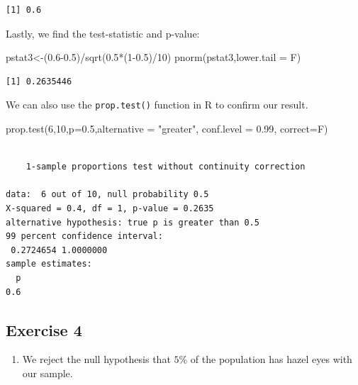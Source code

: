 \documentclass[
  letterpaper,
  DIV=11,
  numbers=noendperiod]{scrreprt}
\newenvironment{Shaded}{\begin{snugshade}}{\end{snugshade}}
\newcommand{\AttributeTok}[1]{\textcolor[rgb]{0.40,0.45,0.13}{#1}}
\newcommand{\DecValTok}[1]{\textcolor[rgb]{0.68,0.00,0.00}{#1}}
\newcommand{\FloatTok}[1]{\textcolor[rgb]{0.68,0.00,0.00}{#1}}
\newcommand{\FunctionTok}[1]{\textcolor[rgb]{0.28,0.35,0.67}{#1}}
\newcommand{\NormalTok}[1]{\textcolor[rgb]{0.00,0.23,0.31}{#1}}
\newcommand{\OtherTok}[1]{\textcolor[rgb]{0.00,0.23,0.31}{#1}}
\newcommand{\SpecialCharTok}[1]{\textcolor[rgb]{0.37,0.37,0.37}{#1}}
\newcommand{\StringTok}[1]{\textcolor[rgb]{0.13,0.47,0.30}{#1}}
\providecommand{\tightlist}{%
  \setlength{\itemsep}{0pt}\setlength{\parskip}{0pt}}\usepackage{longtable,booktabs,array}
\begin{document}
\begin{verbatim}
[1] 0.6
\end{verbatim}

Lastly, we find the test-statistic and p-value:

\begin{Shaded}
\begin{Highlighting}[numbers=left,,]
\NormalTok{pstat3}\OtherTok{\textless{}{-}}\NormalTok{(}\FloatTok{0.6{-}0.5}\NormalTok{)}\SpecialCharTok{/}\FunctionTok{sqrt}\NormalTok{(}\FloatTok{0.5}\SpecialCharTok{*}\NormalTok{(}\DecValTok{1}\FloatTok{{-}0.5}\NormalTok{)}\SpecialCharTok{/}\DecValTok{10}\NormalTok{)}
\FunctionTok{pnorm}\NormalTok{(pstat3,}\AttributeTok{lower.tail =}\NormalTok{ F)}
\end{Highlighting}
\end{Shaded}

\begin{verbatim}
[1] 0.2635446
\end{verbatim}

We can also use the \texttt{prop.test()} function in R to confirm our
result.

\begin{Shaded}
\begin{Highlighting}[numbers=left,,]
\FunctionTok{prop.test}\NormalTok{(}\DecValTok{6}\NormalTok{,}\DecValTok{10}\NormalTok{,}\AttributeTok{p=}\FloatTok{0.5}\NormalTok{,}\AttributeTok{alternative =} \StringTok{"greater"}\NormalTok{, }\AttributeTok{conf.level =} \FloatTok{0.99}\NormalTok{,}
            \AttributeTok{correct=}\NormalTok{F)}
\end{Highlighting}
\end{Shaded}

\begin{verbatim}

    1-sample proportions test without continuity correction

data:  6 out of 10, null probability 0.5
X-squared = 0.4, df = 1, p-value = 0.2635
alternative hypothesis: true p is greater than 0.5
99 percent confidence interval:
 0.2724654 1.0000000
sample estimates:
  p 
0.6 
\end{verbatim}

\hypertarget{exercise-4-13}{%
\subsection*{Exercise 4}\label{exercise-4-13}}

\begin{blackbox}

\begin{enumerate}
\def\labelenumi{\arabic{enumi}.}
\tightlist
\item
  We reject the null hypothesis that \(5\)\% of the population has hazel
  eyes with our sample.
\end{enumerate}

\end{blackbox}
\end{document}
